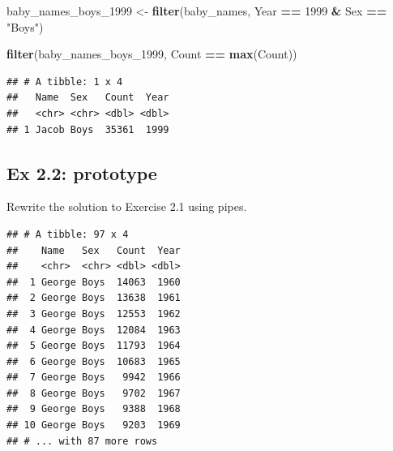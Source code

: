 \documentclass[]{book}
\newenvironment{Shaded}{\begin{snugshade}}{\end{snugshade}}
\newcommand{\KeywordTok}[1]{\textcolor[rgb]{0.13,0.29,0.53}{\textbf{#1}}}
\newcommand{\DecValTok}[1]{\textcolor[rgb]{0.00,0.00,0.81}{#1}}
\newcommand{\StringTok}[1]{\textcolor[rgb]{0.31,0.60,0.02}{#1}}
\newcommand{\OperatorTok}[1]{\textcolor[rgb]{0.81,0.36,0.00}{\textbf{#1}}}
\newcommand{\NormalTok}[1]{#1}
\begin{document}
\begin{Shaded}
\begin{Highlighting}[]
\NormalTok{baby_names_boys_}\DecValTok{1999}\NormalTok{ <-}\StringTok{ }\KeywordTok{filter}\NormalTok{(baby_names, }
\NormalTok{                    Year }\OperatorTok{==}\StringTok{ }\DecValTok{1999} \OperatorTok{&}\StringTok{ }\NormalTok{Sex }\OperatorTok{==}\StringTok{ "Boys"}\NormalTok{)}
\end{Highlighting}
\end{Shaded}

\begin{Shaded}
\begin{Highlighting}[]
\KeywordTok{filter}\NormalTok{(baby_names_boys_}\DecValTok{1999}\NormalTok{, Count }\OperatorTok{==}\StringTok{ }\KeywordTok{max}\NormalTok{(Count))}
\end{Highlighting}
\end{Shaded}

\begin{verbatim}
## # A tibble: 1 x 4
##   Name  Sex   Count  Year
##   <chr> <chr> <dbl> <dbl>
## 1 Jacob Boys  35361  1999
\end{verbatim}

\subsection{Ex 2.2: prototype}\label{ex-2.2-prototype}

Rewrite the solution to Exercise 2.1 using pipes.

\begin{Shaded}
\end{Shaded}

\begin{verbatim}
## # A tibble: 97 x 4
##    Name   Sex   Count  Year
##    <chr>  <chr> <dbl> <dbl>
##  1 George Boys  14063  1960
##  2 George Boys  13638  1961
##  3 George Boys  12553  1962
##  4 George Boys  12084  1963
##  5 George Boys  11793  1964
##  6 George Boys  10683  1965
##  7 George Boys   9942  1966
##  8 George Boys   9702  1967
##  9 George Boys   9388  1968
## 10 George Boys   9203  1969
## # ... with 87 more rows
\end{verbatim}
\end{document}
